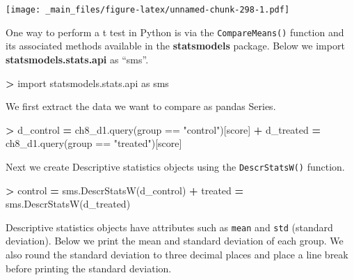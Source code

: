 \documentclass[
]{book}
\newenvironment{Shaded}{\begin{snugshade}}{\end{snugshade}}
\newcommand{\ImportTok}[1]{#1}
\newcommand{\NormalTok}[1]{#1}
\newcommand{\OperatorTok}[1]{\textcolor[rgb]{0.81,0.36,0.00}{\textbf{#1}}}
\newcommand{\StringTok}[1]{\textcolor[rgb]{0.31,0.60,0.02}{#1}}
\begin{document}
\texttt{[image: \_main\_files/figure-latex/unnamed-chunk-298-1.pdf]}

One way to perform a t test in Python is via the \texttt{CompareMeans()} function and its associated methods available in the \textbf{statsmodels} package. Below we import \textbf{statsmodels.stats.api} as ``sms''.

\begin{Shaded}
\begin{Highlighting}[]
\OperatorTok{\textgreater{}} \ImportTok{import}\NormalTok{ statsmodels.stats.api }\ImportTok{as}\NormalTok{ sms}
\end{Highlighting}
\end{Shaded}

We first extract the data we want to compare as pandas Series.

\begin{Shaded}
\begin{Highlighting}[]
\OperatorTok{\textgreater{}}\NormalTok{ d\_control }\OperatorTok{=}\NormalTok{ ch8\_d1.query(}\StringTok{\textquotesingle{}group == "control"\textquotesingle{}}\NormalTok{)[}\StringTok{\textquotesingle{}score\textquotesingle{}}\NormalTok{]}
\OperatorTok{+}\NormalTok{ d\_treated }\OperatorTok{=}\NormalTok{ ch8\_d1.query(}\StringTok{\textquotesingle{}group == "treated"\textquotesingle{}}\NormalTok{)[}\StringTok{\textquotesingle{}score\textquotesingle{}}\NormalTok{]}
\end{Highlighting}
\end{Shaded}

Next we create Descriptive statistics objects using the \texttt{DescrStatsW()} function.

\begin{Shaded}
\begin{Highlighting}[]
\OperatorTok{\textgreater{}}\NormalTok{ control }\OperatorTok{=}\NormalTok{ sms.DescrStatsW(d\_control)}
\OperatorTok{+}\NormalTok{ treated }\OperatorTok{=}\NormalTok{ sms.DescrStatsW(d\_treated)}
\end{Highlighting}
\end{Shaded}

Descriptive statistics objects have attributes such as \texttt{mean} and \texttt{std} (standard deviation). Below we print the mean and standard deviation of each group. We also round the standard deviation to three decimal places and place a line break before printing the standard deviation.
\end{document}
